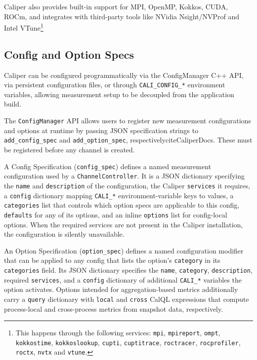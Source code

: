 Caliper also provides built-in support for MPI\cite{mpiStandard}, OpenMP\cite{ompStandard}, Kokkos\cite{kokkos}, CUDA\cite{cuda}, ROCm\cite{rocm}, and integrates with third-party tools like NVidia Nsight/NVProf\cite{nvprof,nsight} and Intel VTune\cite{VtuneManual}\footnote{This happens through the following services: \texttt{mpi}, \texttt{mpireport}, \texttt{ompt}, \texttt{kokkostime}, \texttt{kokkoslookup}, \texttt{cupti}, \texttt{cuptitrace}, \texttt{roctracer}, \texttt{rocprofiler}, \texttt{roctx}, \texttt{nvtx} and \texttt{vtune}.}\cite[Building Caliper, Connection to third-party tools]{CaliperDocs}

\subsection{Config and Option Specs}
\label{subsec:cali-config-option-specs}

Caliper can be configured programmatically via the ConfigManager C++ API, via persistent configuration files, or through \texttt{CALI\_CONFIG\_*} environment variables, allowing measurement setup to be decoupled from the application build\cite{CaliperDocs}.

The \texttt{ConfigManager} API allows users to register new measurement configurations and options at runtime by passing JSON specification strings to \texttt{add\_config\_spec} and \texttt{add\_option\_spec}, respectivelycite{CaliperDocs}. These must be registered before any channel is created.

A Config Specification (\texttt{config\_spec}) defines a named measurement configuration used by a \texttt{ChannelController}. It is a JSON dictionary specifying the \texttt{name} and \texttt{description} of the configuration, the Caliper \texttt{services} it requires, a \texttt{config} dictionary mapping \texttt{CALI\_*} environment-variable keys to values, a \texttt{categories} list that controls which option specs are applicable to this config, \texttt{defaults} for any of its options, and an inline \texttt{options} list for config-local options. When the required services are not present in the Caliper installation, the configuration is silently unavailable.

An Option Specification (\texttt{option\_spec}) defines a named configuration modifier that can be applied to any config that lists the option's \texttt{category} in its \texttt{categories} field. Its JSON dictionary specifies the \texttt{name}, \texttt{category}, \texttt{description}, required \texttt{services}, and a \texttt{config} dictionary of additional \texttt{CALI\_*} variables the option activates. Options intended for aggregation-based metrics additionally carry a \texttt{query} dictionary with \texttt{local} and \texttt{cross} CalQL expressions that compute process-local and cross-process metrics from snapshot data, respectively.

